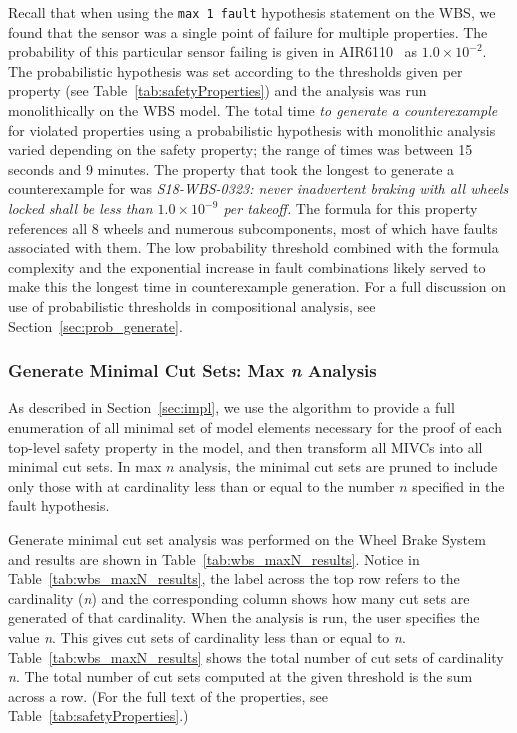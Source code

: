 Recall that when using the \texttt{max 1 fault} hypothesis statement on the WBS, we found that the sensor was a single point of failure for multiple properties. The probability of this particular sensor failing is given in AIR6110~\cite{AIR6110} as $1.0 \times 10^{-2}$. The probabilistic hypothesis was set according to the thresholds given per property (see Table~\ref{tab:safetyProperties}) and the analysis was run monolithically on the WBS model. The total time {\em to generate a counterexample} for violated properties using a probabilistic hypothesis with monolithic analysis varied depending on the safety property; the range of times was between 15 seconds and 9 minutes. The property that took the longest to generate a counterexample for was {\em S18-WBS-0323: never inadvertent braking with all wheels locked shall be less than $1.0 \times 10^{-9}$ per takeoff.} The formula for this property references all 8 wheels and numerous subcomponents, most of which have faults associated with them. The low probability threshold combined with the formula complexity and the exponential increase in fault combinations likely served to make this the longest time in counterexample generation. For a full discussion on use of probabilistic thresholds in compositional analysis, see Section~\ref{sec:prob_generate}.

\subsubsection{Generate Minimal Cut Sets: Max \textit{n} Analysis}
\label{sec:maxN_generate}
As described in Section~\ref{sec:impl}, we use the \aivcalg algorithm to provide a full enumeration of all minimal set of model elements necessary for the proof of each top-level safety property in the model, and then transform all MIVCs into all minimal cut sets. In max $n$ analysis, the minimal cut sets are pruned to include only those with at cardinality less than or equal to the number $n$ specified in the fault hypothesis.

Generate minimal cut set analysis was performed on the Wheel Brake System and results are shown in Table~\ref{tab:wbs_maxN_results}. Notice in Table~\ref{tab:wbs_maxN_results}, the label across the top row refers to the cardinality (\textit{n}) and the corresponding column shows how many cut sets are generated of that cardinality. When the analysis is run, the user specifies the value \textit{n}. This gives cut sets of cardinality less than or equal to \textit{n}. Table~\ref{tab:wbs_maxN_results} shows the total number of cut sets of cardinality \textit{n}. The total number of cut sets computed at the given threshold is the sum across a row. (For the full text of the properties, see Table~\ref{tab:safetyProperties}.) 


